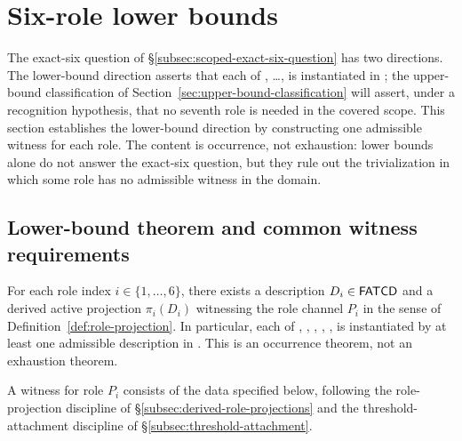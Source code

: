 \section{Six-role lower bounds}\label{sec:lower-bounds}



The exact-six question of
\S\ref{subsec:scoped-exact-six-question} has two directions. The
lower-bound direction asserts that each of \Pone{}, \ldots, \Psix{}
is instantiated in \FATCD{}; the upper-bound classification of
Section~\ref{sec:upper-bound-classification} will assert, under a recognition
hypothesis, that no seventh role is needed in the covered scope. This section establishes the
lower-bound direction by constructing one admissible witness for each
role. The content is occurrence, not exhaustion: lower bounds alone
do not answer the exact-six question, but they rule out the
trivialization in which some role has no admissible witness in the
domain.

\subsection{Lower-bound theorem and common witness requirements}\label{subsec:lower-bound-theorem}

\begin{theorem}\label{thm:six-role-lower-bounds}
For each role index \(i \in \{1,\ldots,6\}\), there exists a description
\(D_i \in \mathsf{FATCD}{}\) and a derived active projection
\(\pi_i(D_i)\) witnessing the role channel \(P_i\) in the sense of
Definition~\ref{def:role-projection}. In particular, each of
\Pone{}, \Ptwo{}, \Pthree{}, \Pfour{}, \Pfive{}, \Psix{} is instantiated
by at least one admissible description in \FATCD{}. This is an occurrence
theorem, not an exhaustion theorem.
\end{theorem}

A witness for role \(P_i\) consists of the data specified below,
following the role-projection discipline of
\S\ref{subsec:derived-role-projections} and the threshold-attachment
discipline of \S\ref{subsec:threshold-attachment}.

